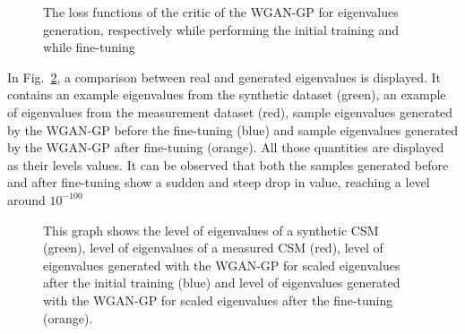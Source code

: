 \documentclass[11pt,a4paper,twoside]{report}
\begin{document}
\begin{figure}
    \centering
    \caption{The loss functions of the critic of the WGAN-GP for eigenvalues generation, respectively while performing the initial training and while fine-tuning}
    \label{fig:loss_evals_wgangp}
\end{figure}

In Fig.~\ref{fig:samples_evals_wgangp}, a comparison between real and generated eigenvalues is displayed. It contains an example eigenvalues from the synthetic dataset (green), an example of eigenvalues from the measurement dataset (red), sample eigenvalues generated by the WGAN-GP before the fine-tuning (blue) and sample eigenvalues generated by the WGAN-GP after fine-tuning (orange). All those quantities are displayed as their levels values. It can be observed that both the samples generated before and after fine-tuning show a sudden and steep drop in value, reaching a level around $10^{-100}$

\begin{figure}
    \centering
    \caption{This graph shows the level of eigenvalues of a synthetic CSM (green), level of eigenvalues of a measured CSM (red), level of eigenvalues generated with the WGAN-GP for scaled eigenvalues after the initial training (blue) and level of eigenvalues generated with the WGAN-GP for scaled eigenvalues after the fine-tuning (orange).}
    \label{fig:samples_evals_wgangp}
\end{figure}
\end{document}
